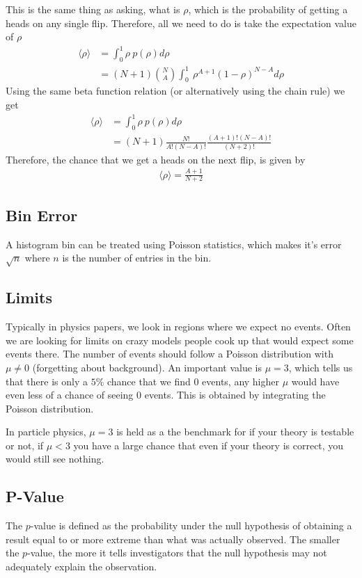 This is the same thing as asking, what is $\rho$, which is the probability of getting a heads on any single flip. Therefore, all we need to do is take the expectation value of $\rho$
\begin{align}
	\langle \rho\rangle &= \int_0^1\rho ~p(\rho) d\rho\\
	&= (N+1){N\choose A}\int_0^1 ~\rho^{A+1}(1-\rho)^{N-A} d\rho
\end{align}
Using the same beta function relation (or alternatively using the chain rule) we get
\begin{align}
	\langle \rho\rangle &= \int_0^1\rho ~p(\rho) d\rho\\
	&= (N+1)\frac{N!}{A!(N-A)!}\frac{(A+1)!(N-A)!}{(N+2)!}
\end{align}
Therefore, the chance that we get a heads on the next flip, is given by
\begin{align}
	\langle\rho\rangle = \frac{A+1}{N+2}
\end{align}


\subsection{Bin Error}
A histogram bin can be treated using Poisson statistics, which makes it's error $\sqrt{n}$ where $n$ is the number of entries in the bin.



\subsection{Limits}
Typically in physics papers, we look in regions where we expect no events. Often we are looking for limits on crazy models people cook up that would expect some events there. The number of events should follow a Poisson distribution with $\mu\neq 0$ (forgetting about background). An important value is $\mu=3$, which tells us that there is only a $5\%$ chance that we find 0 events, any higher $\mu$ would have even less of a chance of seeing 0 events. This is obtained by integrating the Poisson distribution.

 In particle physics, $\mu=3$ is held as a the benchmark for if your theory is testable or not, if $\mu < 3$ you have a large chance that even if your theory is correct, you would still see nothing. 


\subsection{P-Value}
The $p$-value is defined as the probability under the null hypothesis of obtaining a result equal to or more extreme than what was actually observed. The smaller the $p$-value, the more it tells investigators that the null hypothesis may not adequately explain the observation.

